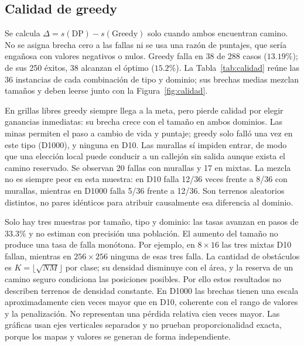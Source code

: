 \subsection{Calidad de greedy}
Se calcula $\Delta=s(\mathrm{DP})-s(\mathrm{Greedy})$ solo cuando ambos
encuentran camino. No se asigna brecha cero a las fallas ni se usa una
razón de puntajes, que sería engañosa con valores negativos o nulos.
Greedy falla en 38 de 288 casos ($13.19\%$); de sus 250 éxitos, 38
alcanzan el óptimo ($15.2\%$). La Tabla~\ref{tab:calidad} reúne las 36
instancias de cada combinación de tipo y dominio; sus brechas medias
mezclan tamaños y deben leerse junto con la Figura~\ref{fig:calidad}.

\begin{table}[H]
\centering\small

\caption{Fallas sobre todas las instancias; brecha media condicionada al éxito.}
\label{tab:calidad}
\end{table}



En grillas libres greedy siempre llega a la meta, pero pierde calidad
por elegir ganancias inmediatas: su brecha crece con el tamaño en ambos
dominios. Las minas permiten el paso a cambio de vida y puntaje; greedy
solo falló una vez en este tipo (D1000), y ninguna en D10. Las murallas
sí impiden entrar, de modo que una elección local puede conducir a un
callejón sin salida aunque exista el camino reservado. Se observan 20
fallas con murallas y 17 en mixtas. La mezcla no es siempre peor en esta
muestra: en D10 falla 12/36 veces frente a 8/36 con murallas, mientras en
D1000 falla 5/36 frente a 12/36. Son terrenos aleatorios distintos, no
pares idénticos para atribuir causalmente esa diferencia al dominio.

Solo hay tres muestras por tamaño, tipo y dominio: las tasas avanzan en
pasos de $33.3\%$ y no estiman con precisión una población.
El aumento del tamaño no produce una tasa de falla monótona. Por ejemplo,
en $8\times16$ las tres mixtas D10 fallan, mientras en $256\times256$
ninguna de esas tres falla. La cantidad de obstáculos es
$K=\lfloor\sqrt{NM}\rfloor$ por clase; su densidad disminuye con el área,
y la reserva de un camino seguro condiciona las posiciones posibles.
Por ello estos resultados no describen terrenos de densidad constante.
En D1000 las brechas tienen una escala aproximadamente cien veces mayor
que en D10, coherente con el rango de valores y la penalización. No
representan una pérdida relativa cien veces mayor. Las gráficas usan
ejes verticales separados y no prueban proporcionalidad exacta, porque
los mapas y valores se generan de forma independiente.


